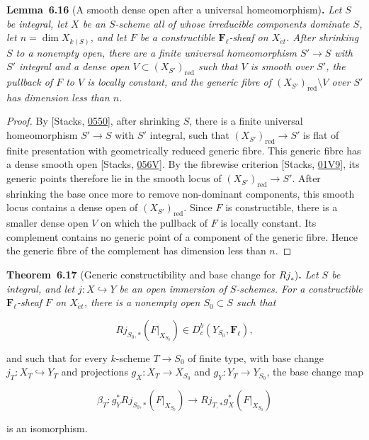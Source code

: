 \documentclass[11pt]{article}
\newenvironment{bpstatement}[2]{\par\addvspace{0.6\baselineskip}\noindent\textbf{#1}#2\textbf{.}\enspace\ignorespaces}
  {\par\addvspace{0.4\baselineskip}}
\newenvironment{bpstatementit}[2]{\begin{bpstatement}{#1}{#2}\itshape\ignorespaces}{\end{bpstatement}}
\providecommand{\Dbc}{}\renewcommand{\Dbc}{D^b_c}
\providecommand{\Fell}{}\renewcommand{\Fell}{\mathbf F_\ell}
\begin{document}
\label{bp561}%
\begin{bpstatementit}{Lemma~6.16}{ (A smooth dense open after a universal homeomorphism)}
Let \(S\) be integral, let \(X\) be an \(S\)-scheme all of whose irreducible components dominate \(S\), let \(n=\dim X_{k(S)}\), and let \(F\) be a constructible \(\Fell\)-sheaf on \(X_{\acute{e}t}\). After shrinking \(S\) to a nonempty open, there are a finite universal homeomorphism \(S'\to S\) with \(S'\) integral and a dense open \(V\subset(X_{S'})_{\mathrm{red}}\) such that \(V\) is smooth over \(S'\), the pullback of \(F\) to \(V\) is locally constant, and the generic fibre of \((X_{S'})_{\mathrm{red}}\setminus V\) over \(S'\) has dimension less than \(n\).
\end{bpstatementit}

\begin{proof}[{Proof}]\label{bp562}%
By [Stacks, \href{https://stacks.math.columbia.edu/tag/0550}{0550}], after shrinking \(S\), there is a finite universal homeomorphism \(S'\to S\) with \(S'\) integral, such that \((X_{S'})_{\mathrm{red}}\to S'\) is flat of finite presentation with geometrically reduced generic fibre. This generic fibre has a dense smooth open [Stacks, \href{https://stacks.math.columbia.edu/tag/056V}{056V}]. By the fibrewise criterion [Stacks, \href{https://stacks.math.columbia.edu/tag/01V9}{01V9}], its generic points therefore lie in the smooth locus of \((X_{S'})_{\mathrm{red}}\to S'\). After shrinking the base once more to remove non-dominant components, this smooth locus contains a dense open of \((X_{S'})_{\mathrm{red}}\). Since \(F\) is constructible, there is a smaller dense open \(V\) on which the pullback of \(F\) is locally constant. Its complement contains no generic point of a component of the generic fibre. Hence the generic fibre of the complement has dimension less than \(n\).
\end{proof}

\label{bp563}%
\begin{bpstatementit}{Theorem~6.17}{ (Generic constructibility and base change for $Rj_*$)}
Let \(S\) be integral, and let \(j:X\hookrightarrow Y\) be an open immersion of \(S\)-schemes. For a constructible \(\Fell\)-sheaf \(F\) on \(X_{\acute{e}t}\), there is a nonempty open \(S_0\subset S\) such that

\[
Rj_{S_0,*}(F|_{X_{S_0}})\in\Dbc(Y_{S_0},\Fell),
\tag{6.19}
\]

and such that for every \(k\)-scheme \(T\to S_0\) of finite type, with base change \(j_T:X_T\hookrightarrow Y_T\) and projections \(g_X:X_T\to X_{S_0}\) and \(g_Y:Y_T\to Y_{S_0}\), the base change map

\[
\beta_T:g_Y^*Rj_{S_0,*}(F|_{X_{S_0}})
\longrightarrow Rj_{T,*}g_X^*(F|_{X_{S_0}})
\tag{6.20}
\]

is an isomorphism.
\end{bpstatementit}
\end{document}
